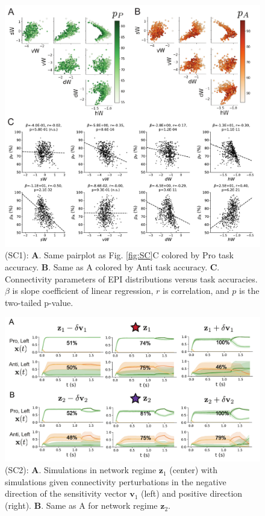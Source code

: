 \documentclass[11pt]{article}
\begin{document}
\begin{figure}
\begin{center}
\includegraphics[scale=0.9]{figures/figSC1/figSC1.pdf}
\end{center}
\caption{\small (SC1): \textbf{A}. Same pairplot as Fig. \ref{fig:SC}C colored by Pro task accuracy.  
\textbf{B}. Same as A colored by Anti task accuracy.  
\textbf{C}. Connectivity parameters of EPI distributions versus task accuracies.  $\beta$ is slope coefficient of linear regression, $r$ is correlation, and $p$ is the two-tailed p-value.
}
\label{fig:SC1}
\end{figure}

\begin{figure}
\begin{center}
\includegraphics[scale=0.8]{figures/figSC2/figSC2.pdf}
\end{center}
\caption{\small (SC2):  
\textbf{A}. Simulations in network regime $\mathbf{z}_1$ (center) with simulations given connectivity perturbations in the negative direction of the sensitivity vector $\mathbf{v}_1$ (left) and positive direction (right).
\textbf{B}. Same as A for network regime $\mathbf{z}_2$.
}
\label{fig:SC2}
\end{figure}
\end{document}
